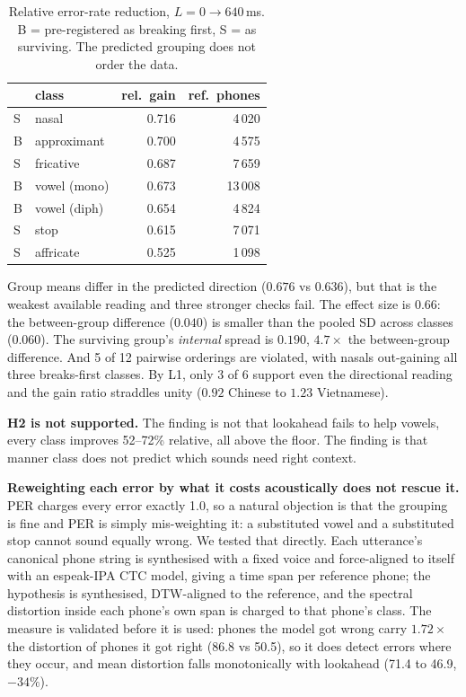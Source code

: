 \documentclass[9pt,a4paper,twocolumn]{article}
\begin{document}
\begin{table}[t]
\centering\small
\caption{Relative error-rate reduction, $L{=}0\rightarrow640$\,ms. B =
pre-registered as breaking first, S = as surviving. The predicted grouping does
not order the data.}
\label{tab:h2}
\begin{tabular}{llrr}
\toprule
& class & rel.\ gain & ref.\ phones \\
\midrule
S & nasal        & 0.716 & 4\,020 \\
B & approximant  & 0.700 & 4\,575 \\
S & fricative    & 0.687 & 7\,659 \\
B & vowel (mono) & 0.673 & 13\,008 \\
B & vowel (diph) & 0.654 & 4\,824 \\
S & stop         & 0.615 & 7\,071 \\
S & affricate    & 0.525 & 1\,098 \\
\bottomrule
\end{tabular}
\end{table}

Group means differ in the predicted direction ($0.676$ vs $0.636$), but that is
the weakest available reading and three stronger checks fail. The effect size
is $0.66$: the between-group difference ($0.040$) is smaller than the pooled SD
across classes ($0.060$). The surviving group's \emph{internal} spread is
$0.190$, $4.7\times$ the between-group difference. And 5 of 12 pairwise
orderings are violated, with nasals out-gaining all three breaks-first classes.
By L1, only 3 of 6 support even the directional reading and the gain ratio
straddles unity ($0.92$ Chinese to $1.23$ Vietnamese).

\textbf{H2 is not supported.} The finding is not that lookahead fails to help
vowels, every class improves 52--72\% relative, all above the floor. The
finding is that manner class does not predict which sounds need right context.

\textbf{Reweighting each error by what it costs acoustically does not rescue
it.} PER charges every error exactly 1.0, so a natural objection is that the
grouping is fine and PER is simply mis-weighting it: a substituted vowel and a
substituted stop cannot sound equally wrong. We tested that directly. Each
utterance's canonical phone string is synthesised with a fixed voice and
force-aligned to itself with an espeak-IPA CTC model, giving a time span per
reference phone; the hypothesis is synthesised, DTW-aligned to the reference,
and the spectral distortion inside each phone's own span is charged to that
phone's class. The measure is validated before it is used: phones the model got
wrong carry $1.72\times$ the distortion of phones it got right (86.8 vs 50.5),
so it does detect errors where they occur, and mean distortion falls
monotonically with lookahead (71.4 to 46.9, $-34\%$).
\end{document}
